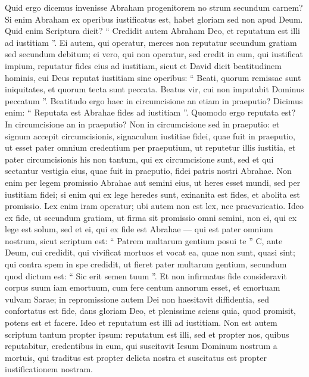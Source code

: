 \begin{biblechapter}
\begin{biblechapter}
\begin{biblechapter}
\begin{biblechapter}
\verse Quid ergo dicemus invenisse Abraham progenitorem no strum secundum carnem? 
\verse Si enim Abraham ex operibus iustificatus est, habet gloriam sed non apud Deum. 
\verse Quid enim Scriptura dicit? “ Credidit autem Abraham Deo, et reputatum est illi ad iustitiam ”.
 \verse Ei autem, qui operatur, merces non reputatur secundum gratiam sed secundum debitum; 
\verse ei vero, qui non operatur, sed credit in eum, qui iustificat impium, reputatur fides eius ad iustitiam, 
\verse sicut et David dicit beatitudinem hominis, cui Deus reputat iustitiam sine operibus:
 \verse “ Beati, quorum remissae sunt iniquitates,
 et quorum tecta sunt peccata.
 \verse Beatus vir, cui non imputabit Dominus peccatum ”.
 \verse Beatitudo ergo haec in circumcisione an etiam in praeputio? Dicimus enim: “ Reputata est Abrahae fides ad iustitiam ”. 
\verse Quomodo ergo reputata est? In circumcisione an in praeputio? Non in circumcisione sed in praeputio: 
\verse et signum accepit circumcisionis, signaculum iustitiae fidei, quae fuit in praeputio, ut esset pater omnium credentium per praeputium, ut reputetur illis iustitia, 
\verse et pater circumcisionis his non tantum, qui ex circumcisione sunt, sed et qui sectantur vestigia eius, quae fuit in praeputio, fidei patris nostri Abrahae.
 \verse Non enim per legem promissio Abrahae aut semini eius, ut heres esset mundi, sed per iustitiam fidei; 
\verse si enim qui ex lege heredes sunt, exinanita est fides, et abolita est promissio. 
\verse Lex enim iram operatur; ubi autem non est lex, nec praevaricatio. 
\verse Ideo ex fide, ut secundum gratiam, ut firma sit promissio omni semini, non ei, qui ex lege est solum, sed et ei, qui ex fide est Abrahae — qui est pater omnium nostrum, 
\verse sicut scriptum est: “ Patrem multarum gentium posui te ” C, ante Deum, cui credidit, qui vivificat mortuos et vocat ea, quae non sunt, quasi sint; 
\verse qui contra spem in spe credidit, ut fieret pater multarum gentium, secundum quod dictum est: “ Sic erit semen tuum ”. 
\verse Et non infirmatus fide consideravit corpus suum iam emortuum, cum fere centum annorum esset, et emortuam vulvam Sarae; 
\verse in repromissione autem Dei non haesitavit diffidentia, sed confortatus est fide, dans gloriam Deo, 
 \verse et plenissime sciens quia, quod promisit, potens est et facere. 
\verse Ideo et reputatum est illi ad iustitiam.
 \verse Non est autem scriptum tantum propter ipsum: reputatum est illi, 
\verse sed et propter nos, quibus reputabitur, credentibus in eum, qui suscitavit Iesum Dominum nostrum a mortuis, 
\verse qui traditus est propter delicta nostra et suscitatus est propter iustificationem nostram.
 

\end{biblechapter}
\end{biblechapter}
\end{biblechapter}
\end{biblechapter}

